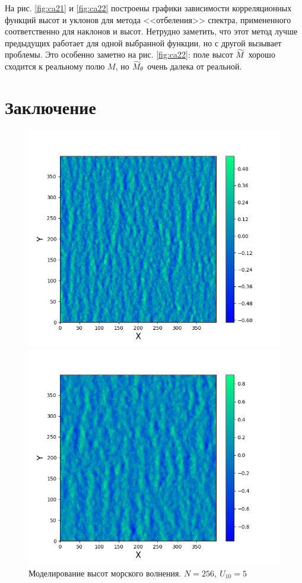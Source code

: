 На рис. \ref{fig:ca21} и \ref{fig:ca22} построены графики зависимости корреляционных функций высот и уклонов для метода <<отбеления>> спектра, примененного соответственно для наклонов и высот. Нетрудно заметить, что этот метод лучше предыдущих работает для одной выбранной функции, но с другой вызывает проблемы. Это особенно заметно на рис. \ref{fig:ca22}: поле высот $\widetilde{M}$ хорошо сходится к реальному полю $M$, но $\widetilde{M}_{\theta}$ очень далека от реальной. 

\newpage
\section{Заключение}


\begin{figure}[h!]
\begin{minipage}[h]{0.45\linewidth}
	\centering
	\includegraphics[width=\linewidth]{img/water5.png}
	\caption{Моделирование высот морского волнения. $N=256, ~ U_{10}=5$ }
	\label{fig:water5}
\end{minipage}
\hfill
\begin{minipage}[h]{0.45\linewidth}
	\centering
	\includegraphics[width=\linewidth]{img/water6.png}

\end{minipage}
\end{figure}
